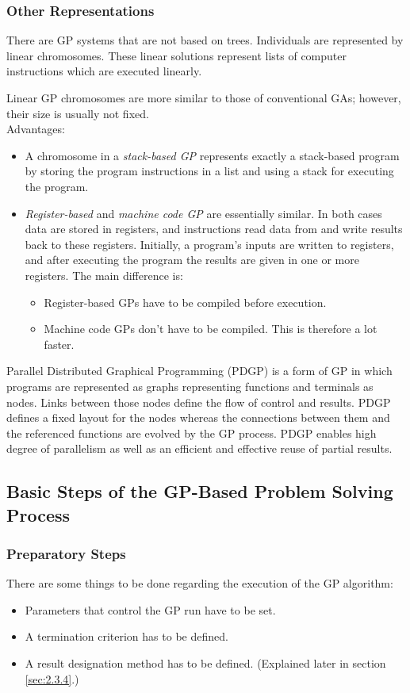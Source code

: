 \documentclass[12pt]{article}
\newcounter{subsubsubsection}[subsubsection]
\begin{document}
\subsubsection{Other Representations}
There are GP systems that are not based on trees.
Individuals are represented by linear chromosomes. These linear solutions represent lists of computer instructions which are executed linearly.

Linear GP chromosomes are more similar to those of conventional GAs; however, their size is usually not fixed.\\
Advantages:
\begin{itemize}
\item A chromosome in a \textit{stack-based GP} represents exactly a stack-based program by storing the program instructions in a list and using a stack for executing the program.
\item \textit{Register-based} and \textit{machine code GP} are essentially similar. In both cases data are stored in registers, and instructions read data from and write results back to these registers. Initially, a program's inputs are written to registers, and after executing the program the results are given in one or more registers. The main difference is:
\begin{itemize}
\item Register-based GPs have to be compiled before execution.
\item Machine code GPs don't have to be compiled. This is therefore a lot faster.
\end{itemize}
\end{itemize}
Parallel Distributed Graphical Programming (PDGP) is a form of GP in which programs are represented as graphs representing functions and terminals as nodes. Links between those nodes define the flow of control and results. PDGP defines a fixed layout for the nodes whereas the connections between them and the referenced functions are evolved by the GP process. PDGP enables high degree of parallelism as well as an efficient and effective reuse of partial results.
\subsection{Basic Steps of the GP-Based Problem Solving Process}
\subsubsection{Preparatory Steps}
There are some things to be done regarding the execution of the GP algorithm:
\begin{itemize}
\item Parameters that control the GP run have to be set.
\item A termination criterion has to be defined.
\item A result designation method has to be defined. (Explained later in section \ref{sec:2.3.4}.)
\end{itemize}
\end{document}
